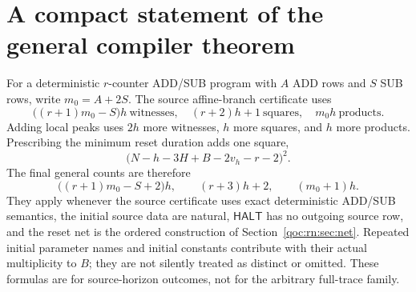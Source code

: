 \documentclass[11pt,letterpaper]{article}
\theoremstyle{definition}
\theoremstyle{remark}
\newcommand{\HALT}{\mathsf{HALT}}
\begin{document}
\section{A compact statement of the general compiler theorem}\label{qoc:rn:app:compiler}
For a deterministic $r$-counter ADD/SUB program with $A$ ADD rows and $S$ SUB rows, write $m_0=A+2S$. The source affine-branch certificate uses
\[
 \bigl((r+1)m_0-S\bigr)h\ \text{witnesses},\quad
 (r+2)h+1\ \text{squares},\quad m_0h\ \text{products}.
\]
Adding local peaks uses $2h$ more witnesses, $h$ more squares, and $h$ more products. Prescribing the minimum reset duration adds one square,
\[
 \bigl(N-h-3H+B-2v_h-r-2\bigr)^2.
\]
The final general counts are therefore
\[
 \bigl((r+1)m_0-S+2\bigr)h,\qquad (r+3)h+2,\qquad (m_0+1)h.
\]
They apply whenever the source certificate uses exact deterministic ADD/SUB semantics, the initial source data are natural, $\HALT$ has no outgoing source row, and the reset net is the ordered construction of Section~\ref{qoc:rn:sec:net}. Repeated initial parameter names and initial constants contribute with their actual multiplicity to $B$; they are not silently treated as distinct or omitted. These formulas are for source-horizon outcomes, not for the arbitrary full-trace family.
\end{document}
